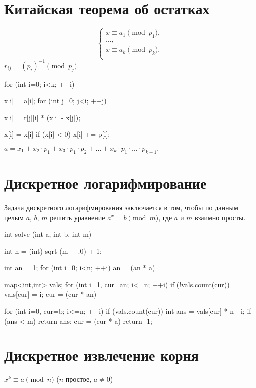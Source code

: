 \documentclass[12pt, titlepage]{article}
\begin{document}
\section{Китайская теорема об остатках}
\begin{equation*}
\left\{
\begin{array}{l}
x \equiv a_1\pmod{p_1},\\
\ldots,\\
x \equiv a_k\pmod{p_k},\\
\end{array}\right.
\end{equation*}
$r_{ij} = (p_i)^{-1}\pmod{p_j}.$
\begin{cppcode}
for (int i=0; i<k; ++i) {
    x[i] = a[i];
    for (int j=0; j<i; ++j) {
        x[i] = r[j][i] * (x[i] - x[j]);
 
        x[i] = x[i] %
        if (x[i] < 0)  x[i] += p[i];
    }
}
\end{cppcode}
$a = x_1 + x_2 \cdot p_1 + x_3 \cdot p_1 \cdot p_2 + \ldots + x_k \cdot p_1 \cdot \ldots \cdot p_{k-1}.$


\section{Дискретное логарифмирование}

Задача дискретного логарифмирования заключается в том, чтобы по данным целым $a$, $b$, $m$ решить уравнение $a^x = b\pmod{m}$, где $a$ и $m$ взаимно просты.

\begin{cppcode}
int solve (int a, int b, int m) {
    int n = (int) sqrt (m + .0) + 1;
 
    int an = 1;
    for (int i=0; i<n; ++i)
        an = (an * a) %
 
    map<int,int> vals;
    for (int i=1, cur=an; i<=n; ++i) {
        if (!vals.count(cur))
            vals[cur] = i;
        cur = (cur * an) %
    }
 
    for (int i=0, cur=b; i<=n; ++i) {
        if (vals.count(cur)) {
            int ans = vals[cur] * n - i;
            if (ans < m)
                return ans;
        }
        cur = (cur * a) %
    }
    return -1;
}
\end{cppcode}

\section{Дискретное извлечение корня}
$x^k \equiv a\pmod{n}$ ($n$ простое, $a \neq 0$)
\end{document}
